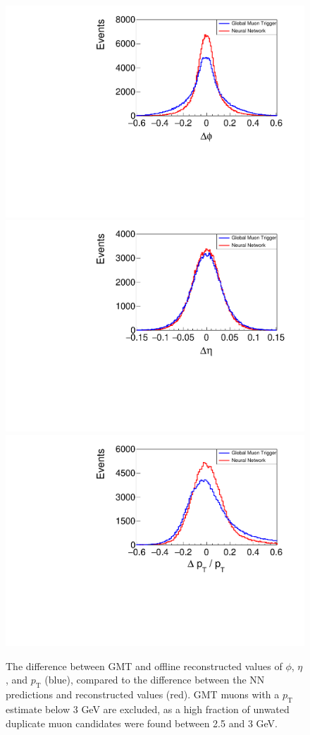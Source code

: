 \documentclass[10pt, paper=a4, UKenglish]{article}
\begin{document}
\begin{figure}[!htb]
  \centering
\includegraphics[width=0.31\linewidth]{./images/delta_phi_no_gauss_GMT_pt_cut.pdf}
\includegraphics[width=0.31\linewidth]{./images/delta_eta_no_gauss_GMT_pt_cut.pdf}
\includegraphics[width=0.31\linewidth]{./images/delta_pt_over_pt_no_gauss_GMT_pt_cut.pdf}
  \caption{The difference between GMT and offline reconstructed values of $\phi$, $\eta$, and $p_\mathrm{T}$ (blue), compared to the difference between the NN predictions and reconstructed values (red). GMT muons with a $p_\mathrm{T}$ estimate below 3 GeV are excluded, as a high fraction of unwated duplicate muon candidates were found between 2.5 and 3 GeV.}
  \label{fig:residuals}
\end{figure}


\end{document}
